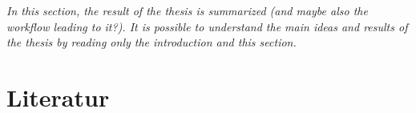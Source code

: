 \documentclass{article}
\begin{document}
\textit{In this section, the result of the thesis is summarized (and maybe also the workflow leading to it?). It is possible to understand the main ideas and results of the thesis by reading only the introduction and this section.}

\listoffigures
        
\section{Literatur}



\end{document}
